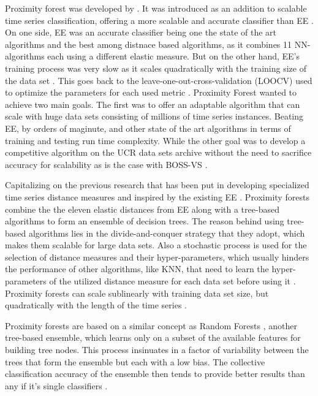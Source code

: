 Proximity forest was developed by \cite{lucas2019proximity}.
It was introduced as an addition to scalable time series classification, offering a more scalable and accurate classifier than EE \cite{tan2020fastee}.
On one side, EE was an accurate classifier being one the state of the art algorithms and the best among distnace based algorithms, as it combines 11 NN-algorithms each using a different elastic measure.
But on the other hand, EE's training process was very slow as it scales quadratically with the training size of the data set \cite{lines2015time,bagnall2017great}.
This goes back to the leave-one-out-cross-validation (LOOCV) used to optimize the parameters for each used metric \cite{shifaz2020ts}.\newline
Proximity Forest wanted to achieve two main goals. The first was to offer an adaptable algorithm that can scale with huge data sets consisting of millions of time series instances.
Beating EE, by orders of maginute, and other state of the art algorithms in terms of training and testing run time complexity.
While the other goal was to develop a competitive algorithm on the UCR data sets archive without the need to sacrifice accuracy for scalability as is the case with BOSS-VS \cite{lucas2019proximity}.\newline

Capitalizing on the previous research that has been put in developing specialized time series distance measures and inspired by the existing EE \cite{fawaz2020inceptiontime,fawaz2019deep}.
Proximity forests combine the the eleven elastic distances from EE along with a tree-based algorithms to form an ensemble of decision trees.
The reason behind using tree-based algorithms lies in the divide-and-conquer strategy that they adopt, which makes them scalable for large data sets.
Also a stochastic process is used for the selection of distance measures and their hyper-parameters, which usually hinders the performance of other algorithms,
like KNN, that need to learn the hyper-parameters of the utilized distance measure for each data set before using it \cite{lucas2019proximity}.
Proximity forests can scale sublinearly with training data set size, but quadratically with the length of the time series \cite{shifaz2020ts}.

Proximity forests are based on a similar concept as Random Forests \cite{breiman2001random}, another tree-based ensemble, which learns only on a subset of the available features
for building tree nodes. This process insinuates in a factor of variability between the trees that form the ensemble but each with a low bias.
The collective classification accuracy of the ensemble then tends to provide better results than any if it's single classifiers \cite{lucas2019proximity}.

